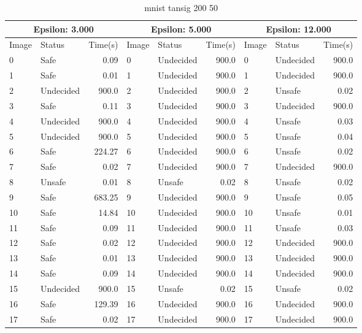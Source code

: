 \begin{table}[!ht]
  \centering
  \caption{mnist tansig 200 50}
  \footnotesize
  \begin{tabular}{|llr|llr|llr|}
    \toprule
    \multicolumn{3}{|c|}{Epsilon: 3.000} & \multicolumn{3}{|c|}{Epsilon: 5.000} & \multicolumn{3}{|c|}{Epsilon: 12.000} \\
    \midrule
    Image & Status & Time(s) &Image & Status & Time(s) &Image & Status & Time(s)\\ 
    \midrule
    0 & Safe & 0.09 &    0 & Undecided & 900.0 &    0 & Undecided & 900.0\\ 
    1 & Safe & 0.01 &    1 & Undecided & 900.0 &    1 & Undecided & 900.0\\ 
    2 & Undecided & 900.0 &    2 & Undecided & 900.0 &    2 & Unsafe & 0.02\\ 
    3 & Safe & 0.11 &    3 & Undecided & 900.0 &    3 & Undecided & 900.0\\ 
    4 & Undecided & 900.0 &    4 & Undecided & 900.0 &    4 & Unsafe & 0.03\\ 
    5 & Undecided & 900.0 &    5 & Undecided & 900.0 &    5 & Unsafe & 0.04\\ 
    6 & Safe & 224.27 &    6 & Undecided & 900.0 &    6 & Unsafe & 0.02\\ 
    7 & Safe & 0.02 &    7 & Undecided & 900.0 &    7 & Undecided & 900.0\\ 
    8 & Unsafe & 0.01 &    8 & Unsafe & 0.02 &    8 & Unsafe & 0.02\\ 
    9 & Safe & 683.25 &    9 & Undecided & 900.0 &    9 & Unsafe & 0.05\\ 
    10 & Safe & 14.84 &    10 & Undecided & 900.0 &    10 & Unsafe & 0.01\\ 
    11 & Safe & 0.09 &    11 & Undecided & 900.0 &    11 & Unsafe & 0.03\\ 
    12 & Safe & 0.02 &    12 & Undecided & 900.0 &    12 & Undecided & 900.0\\ 
    13 & Safe & 0.01 &    13 & Undecided & 900.0 &    13 & Undecided & 900.0\\ 
    14 & Safe & 0.09 &    14 & Undecided & 900.0 &    14 & Undecided & 900.0\\ 
    15 & Undecided & 900.0 &    15 & Unsafe & 0.02 &    15 & Unsafe & 0.02\\ 
    16 & Safe & 129.39 &    16 & Undecided & 900.0 &    16 & Undecided & 900.0\\ 
    17 & Safe & 0.02 &    17 & Undecided & 900.0 &    17 & Undecided & 900.0\\ 

\end{tabular}
\end{table}
